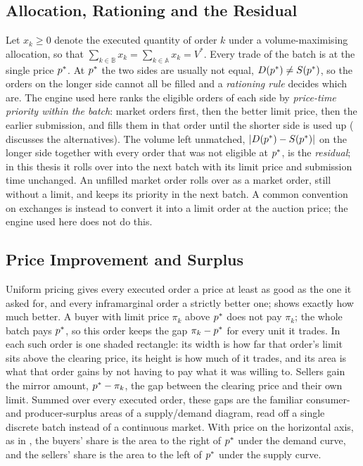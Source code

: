 \subsection{Allocation, Rationing and the Residual}

Let $x_k \ge 0$ denote the executed quantity of order $k$ under a
volume-maximising allocation, so that $\sum_{k \in \mathbb{B}} x_k =
\sum_{k \in \mathbb{A}} x_k = V^{*}$. Every trade of the batch is at the
single price $p^{\ast}$. At $p^{\ast}$ the two sides are usually not equal,
$D(p^{\ast}) \ne S(p^{\ast})$, so the orders on the longer side cannot all be
filled and a \emph{rationing rule} decides which are. The engine used here
ranks the eligible orders of each side by \emph{price-time priority within
the batch}: market orders first, then the better limit price, then the
earlier submission, and fills them in that order until the shorter side
is used up ( discusses the alternatives). The volume
left unmatched, $|D(p^{\ast}) - S(p^{\ast})|$ on the longer side together with
every order that was not eligible at $p^{\ast}$, is the \emph{residual}; in
this thesis it rolls over into the next batch with its limit price and
submission time unchanged. An unfilled market order rolls over as a
market order, still without a limit, and keeps its priority in the next
batch. A common convention on exchanges is instead to convert it into a
limit order at the auction price; the engine used here does not do this.

\subsection{Price Improvement and Surplus}

Uniform pricing gives every executed order a price at least as good as
the one it asked for, and every inframarginal order a strictly better
one;  shows exactly how much better. A buyer
with limit price $\pi_k$ above $p^{\ast}$ does not pay $\pi_k$; the whole
batch pays $p^{\ast}$, so this order keeps the gap $\pi_k - p^{\ast}$ for every
unit it trades. In  each such order is one shaded
rectangle: its width is how far that order's limit sits above the
clearing price, its height is how much of it trades, and its area is
what that order gains by not having to pay what it was willing to.
Sellers gain the mirror amount, $p^{\ast} - \pi_k$, the gap between the
clearing price and their own limit. Summed over every executed order,
these gaps are the familiar consumer- and producer-surplus areas of a
supply/demand diagram, read off a single discrete batch instead of a
continuous market. With price on the horizontal axis, as in
, the buyers' share is the area to the right of
$p^{\ast}$ under the demand curve, and the sellers' share is the area to the
left of $p^{\ast}$ under the supply curve.

